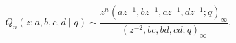 \[Q_{n}(z;a,b,c,d\mid q)\sim\frac{z^{n}\left(az^{-1},bz^{-1},cz^{-1},dz^{-1};q%
\right)_{\infty}}{\left(z^{-2},bc,bd,cd;q\right)_{\infty}},\]